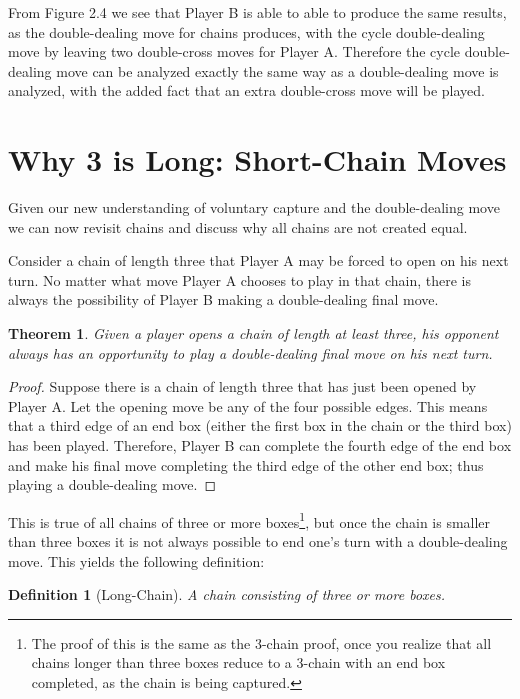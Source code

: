 \documentclass[12pt,twoside]{reedthesis}
\newtheorem{mydef}{Definition}
\newtheorem{theorem}{Theorem}
\begin{document}
From Figure 2.4 we see that Player B is able to able to produce the same results, as the double-dealing move for chains produces, with the cycle double-dealing move by leaving two double-cross moves for Player A.  Therefore the cycle double-dealing move can be analyzed exactly the same way as a double-dealing move is analyzed, with the added fact that an extra double-cross move will be played.


\section{Why 3 is Long: Short-Chain Moves}
Given our new understanding of voluntary capture and the double-dealing move we can now revisit chains and discuss why all chains are not created equal.  

Consider a chain of length three that Player A may be forced to open on his next turn.  No matter what move Player A chooses to play in that chain, there is always the possibility of Player B making a double-dealing final move.

\begin{theorem}
Given a player opens a chain of length at least three, his opponent always has an opportunity to play a double-dealing final move on his next turn.
\end{theorem}

\begin{proof}
Suppose there is a chain of length three that has just been opened by Player A.  Let the opening move be any of the four possible edges.  This means that a third edge of an end box (either the first box in the chain or the third box) has been played.  Therefore, Player B can complete the fourth edge of the end box and make his final move completing the third edge of the other end box; thus playing a double-dealing move.
\end{proof}

\noindent
This is true of all chains of three or more boxes\footnote[3]{The proof of this is the same as the 3-chain proof, once you realize that all chains longer than three boxes reduce to a 3-chain with an end box completed, as the chain is being captured.}, but once the chain is smaller than three boxes it is not always possible to end one's turn with a double-dealing move.  This yields the following definition:

\begin{mydef}[Long-Chain]
A chain consisting of three or more boxes.
\end{mydef}
\end{document}
